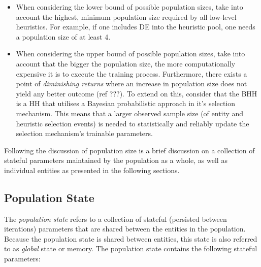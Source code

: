 \begin{itemize}
    \item When considering the lower bound of possible population sizes, take into account the highest, minimum population size required by all low-level heuristics. For example, if one includes \Ac{DE} into the heuristic pool, one needs a population size of at least 4.
    \item When considering the upper bound of possible population sizes, take into account that the bigger the population size, the more computationally expensive it is to execute the training process. Furthermore, there exists a point of \textit{diminishing returns} where an increase in population size does not yield any better outcome (ref ???). To extend on this, consider that the \Ac{BHH} is a \Ac{HH} that utilises a Bayesian probabilistic approach in it's selection mechanism. This means that a larger observed sample size (of entity and heuristic selection events) is needed to statistically and reliably update the selection mechanism's trainable parameters.
\end{itemize}

Following the discussion of population size is a brief discussion on a collection of stateful parameters maintained by the population as a whole, as well as individual entities as presented in the following sections.

\subsection{Population State}
\label{sec:bhh:entity_pool:population_state}

The \textit{population state} refers to a collection of stateful (persisted between iterations) parameters that are shared between the entities in the population. Because the population state is shared between entities, this state is also referred to as \textit{global} state or memory. The population state contains the following stateful parameters:

